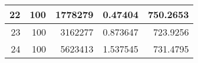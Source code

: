 \begin{table}[htbp]
\begin{tabular}{|r|r|r|r|r|}
		\midrule
		22                                & 100                             & 1778279                         & 0.47404                            & 750.2653                             \\
		\midrule
		23                                & 100                             & 3162277                         & 0.873647                           & 723.9256                             \\
		\midrule
		24                                & 100                             & 5623413                         & 1.537545                           & 731.4795                             \\
		\bottomrule
	\end{tabular}%
	\label{tab:addlabel}%
\end{table}%